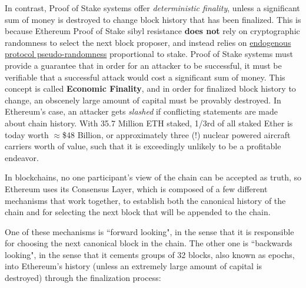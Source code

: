 \documentclass[12pt]{article}
\begin{document}
In contrast, Proof of Stake systems offer \textit{deterministic finality}, unless a significant sum of money is destroyed to change block history that has been finalized. This is because Ethereum Proof of Stake sibyl resistance \textbf{does not} rely on cryptographic randomness to select the next block proposer, and instead relies on \href{https://eth2book.info/capella/part2/building_blocks/randomness/}{endogenous protocol pseudo-randomness} proportional to stake. Proof of Stake systems must provide a guarantee that in order for an attacker to be successful, it must be verifiable that a successful attack would cost a significant sum of money. This concept is called \textbf{Economic Finality}, and in order for finalized block history to change, an obscenely large amount of capital must be provably destroyed. In Ethereum's case, an attacker gets \textit{slashed} if conflicting statements are made about chain history. With 35.7 Million ETH staked, 1/3rd of all staked Ether is today worth $\approx$\$48 Billion, or approximately three (!) nuclear powered aircraft carriers worth of value, such that it is exceedingly unlikely to be a profitable endeavor. 

In blockchains, no one participant's view of the chain can be accepted as truth, so Ethereum uses its Consensus Layer, which is composed of a few different mechanisms that work together, to establish both the canonical history of the chain and for selecting the next block that will be appended to the chain. 

One of these mechanisms is ``forward looking", in the sense that it is responsible for choosing the next canonical block in the chain. The other one is ``backwards looking", in the sense that it cements groups of 32 blocks, also known as epochs, into Ethereum's history (unless an extremely large amount of capital is destroyed) through the finalization process:
\label{Gasper}
\end{document}
